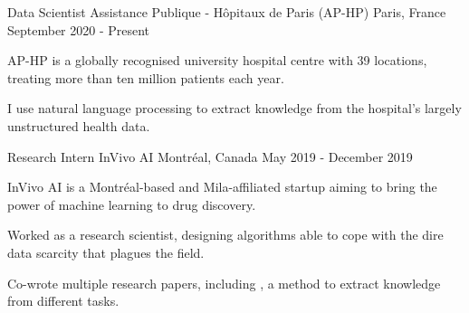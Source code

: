 


\begin{cventries}

    \cventry
    {Data Scientist} %
    {Assistance Publique - Hôpitaux de Paris (AP-HP)} %
    {Paris, France} %
    {September 2020 - Present} %
    {
        AP-HP is a globally recognised university hospital centre with 39 locations, treating more than ten million patients each year.
        \vspace{4.5mm}
        \begin{cvitems} %
          \item I use natural language processing to extract knowledge from the hospital's largely unstructured health data.
        \end{cvitems}
    }


    \cventry
    {Research Intern} %
    {InVivo AI} %
    {Montréal, Canada} %
    {May 2019 - December 2019} %
    {
        InVivo AI is a Montréal-based and Mila-affiliated startup aiming to bring the power of machine learning to drug discovery.
        \vspace{4.5mm}
        \begin{cvitems} %
          \item Worked as a research scientist, designing algorithms able to cope with the dire data scarcity that plagues the field.
          \item Co-wrote multiple research papers, including , a method to extract knowledge from different tasks.
        \end{cvitems}
    }


\end{cventries}
